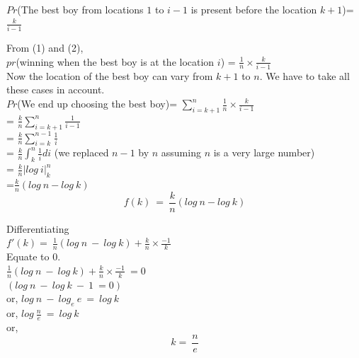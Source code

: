 \documentclass[11pt,fleqn]{book} %
\begin{document}
$Pr$(The best boy from locations $1$ to $i-1$ is present before the location $k+1$)= $\frac{k}{i-1}$

From (1) and (2), \\
$pr$(winning when the best boy is at the location $i$) = $\frac{1}{n} \times \frac{k}{i-1}$\\

Now the location of the best boy can vary from $k+1$ to $n$. We have to take all these cases in account. \\

$Pr$(We end up choosing the best boy)= $\sum_{i=k+1}^n \frac{1}{n} \times \frac{k}{i-1}$\\

= $\frac{k}{n} \sum_{i=k+1}^n \frac{1}{i-1}$\\

= $\frac{k}{n} \sum_{i=k}^{n-1} \frac{1}{i}$\\

= $\frac{k}{n} \int_{k}^{n} \frac{1}{i} di$ (we replaced $n-1$ by $n$ assuming $n$ is a very large number)\\

= $\frac{k}{n}|log\ i|_{k}^{n}$\\

=$\frac{k}{n} (log\ n - log\ k)$\\

\[
 \boxed{f(k)\ =\ \frac{k}{n} (log\ n - log\ k)}
 \]
 
 Differentiating \\
 
 $f'(k)=\ \frac{1}{n} (log\ n\ -\ log\ k) + \frac{k}{n} \times \frac{-1}{k}$\\
 
 Equate to $0$. \\
 
 $\frac{1}{n} (log\ n\ -\ log\ k) + \frac{k}{n} \times \frac{-1}{k}\ =0$\\
 
 $ (log\ n\ -\ log\ k\ -\ 1\ = 0)$\\
 
 or, $log\ n\ -\ log_e\ e\ =\ log\ k$\\
 
 or, $log\ \frac{n}{e}\ =\ log\ k$\\
 
 or, 
\[
 \boxed{k=\ \frac{n}{e}}
 \]
\end{document}
